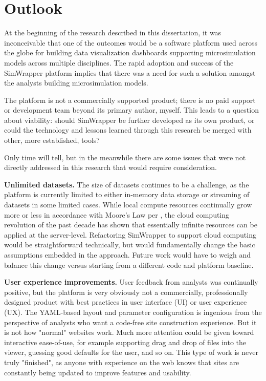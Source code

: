 
\section{Outlook}
\label{08-conclusions-outlook}

At the beginning of the research described in this dissertation, it was inconceivable that one of the outcomes would be a software platform used across the globe for building data visualization dashboards supporting microsimulation models across multiple disciplines. The rapid adoption and success of the SimWrapper platform implies that there was a need for such a solution amongst the analysts building microsimulation models.

The platform is not a commercially supported product; there is no paid support or development team beyond its primary author, myself. This leads to a question about viability: should SimWrapper be further developed as its own product, or could the technology and lessons learned through this research be merged with other, more established, tools?

Only time will tell, but in the meanwhile there are some issues that were not directly addressed in this research that would require consideration.

\textbf{Unlimited datasets.} The size of datasets continues to be a challenge, as the platform is currently limited to either in-memory data storage or streaming of datasets in some limited cases. While local compute resources continually grow more or less in accordance with Moore's Law per \cite{Schaller1997MooresLaw}, the cloud computing revolution of the past decade has shown that essentially infinite resources can be applied at the server-level. Refactoring SimWrapper to support cloud computing would be straightforward technically, but would fundamentally change the basic assumptions embedded in the approach. Future work would have to weigh and balance this change versus starting from a different code and platform baseline.

\textbf{User experience improvements.} User feedback from analysts was continually positive, but the platform is very obviously not a commercially, professionally designed product with best practices in user interface (UI) or user experience (UX). The YAML-based layout and parameter configuration is ingenious from the perspective of analysts who want a code-free site construction experience. But it is not how "normal" websites work. Much more attention could be given toward interactive ease-of-use, for example supporting drag and drop of files into the viewer, guessing good defaults for the user, and so on. This type of work is never truly "finished", as anyone with experience on the web knows that sites are constantly being updated to improve features and usability.

